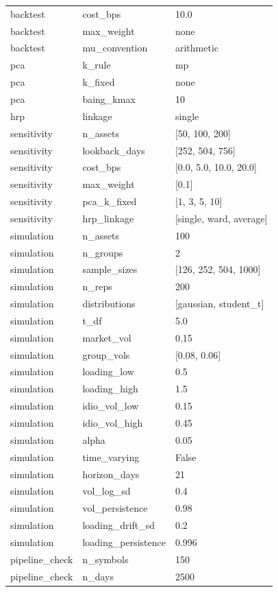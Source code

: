 \begin{table}[t]
{\begin{tabular}{lll}
backtest & cost\_bps & 10.0 \\
backtest & max\_weight & none \\
backtest & mu\_convention & arithmetic \\
pca & k\_rule & mp \\
pca & k\_fixed & none \\
pca & baing\_kmax & 10 \\
hrp & linkage & single \\
sensitivity & n\_assets & [50, 100, 200] \\
sensitivity & lookback\_days & [252, 504, 756] \\
sensitivity & cost\_bps & [0.0, 5.0, 10.0, 20.0] \\
sensitivity & max\_weight & [0.1] \\
sensitivity & pca\_k\_fixed & [1, 3, 5, 10] \\
sensitivity & hrp\_linkage & [single, ward, average] \\
simulation & n\_assets & 100 \\
simulation & n\_groups & 2 \\
simulation & sample\_sizes & [126, 252, 504, 1000] \\
simulation & n\_reps & 200 \\
simulation & distributions & [gaussian, student\_t] \\
simulation & t\_df & 5.0 \\
simulation & market\_vol & 0.15 \\
simulation & group\_vols & [0.08, 0.06] \\
simulation & loading\_low & 0.5 \\
simulation & loading\_high & 1.5 \\
simulation & idio\_vol\_low & 0.15 \\
simulation & idio\_vol\_high & 0.45 \\
simulation & alpha & 0.05 \\
simulation & time\_varying & False \\
simulation & horizon\_days & 21 \\
simulation & vol\_log\_sd & 0.4 \\
simulation & vol\_persistence & 0.98 \\
simulation & loading\_drift\_sd & 0.2 \\
simulation & loading\_persistence & 0.996 \\
pipeline\_check & n\_symbols & 150 \\
pipeline\_check & n\_days & 2500 \\

\end{tabular}}
\end{table}
